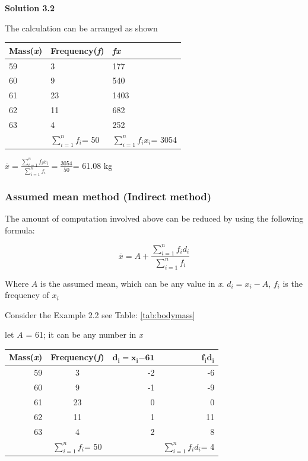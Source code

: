 \documentclass[
]{book}
\begin{document}
\textbf{Solution 3.2}

The calculation can be arranged as shown

\begin{longtable}[]{@{}lll@{}}
\toprule
Mass(\emph{x}) & Frequency(\emph{f}) & \emph{fx} \\
\midrule
\endhead
59 & 3 & 177 \\
60 & 9 & 540 \\
61 & 23 & 1403 \\
62 & 11 & 682 \\
63 & 4 & 252 \\
& \(\sum_{i = 1}^{n}f_{i}\)= 50 & \(\sum_{i = 1}^{n}{f_{i}x_{i}}\)= 3054 \\
\bottomrule
\end{longtable}

\(\overline{x} = \frac{\sum_{i = 1}^{n}{f_{i}x_{i}}}{\sum_{i = 1}^{n}f_{i}} = \frac{3054}{50}\)=
61.08 kg

\hypertarget{assumed-mean-method-indirect-method}{%
\subsubsection{Assumed mean method (Indirect method)}\label{assumed-mean-method-indirect-method}}

The amount of computation involved above can be reduced by using the
following formula:

\[\overline{x} = A + \frac{\sum_{i = 1}^{n}{f_{i}d_{i}}}{\sum_{i = 1}^{n}f_{i}}\]

Where \(A\) is the assumed mean, which can be any value in \emph{x}.
\(d_{i} = x_{i} - A\), \(f_{i}\) is the frequency of \(x_{i}\)

Consider the Example 2.2 see Table: \ref{tab:bodymass}

let \(A\) = 61; it can be any number in \emph{x}

\begin{longtable}[]{@{}rcrr@{}}
\toprule
Mass(\emph{x}) & Frequency(\emph{f}) & \(\mathbf{d}_{\mathbf{i}}\mathbf{=}\mathbf{x}_{\mathbf{i}}\mathbf{-}\mathbf{61}\) & \(\mathbf{f}_{\mathbf{i}}\mathbf{d}_{\mathbf{i}}\) \\
\midrule
\endhead
59 & 3 & -2 & -6 \\
60 & 9 & -1 & -9 \\
61 & 23 & 0 & 0 \\
62 & 11 & 1 & 11 \\
63 & 4 & 2 & 8 \\
& \(\sum_{i = 1}^{n}f_{i}\)= 50 & & \(\sum_{i = 1}^{n}{f_{i}d_{i}}\)= 4 \\
\bottomrule
\end{longtable}
\end{document}
